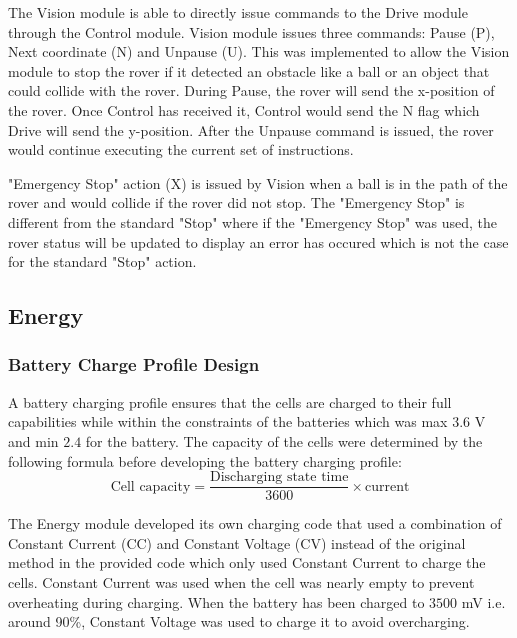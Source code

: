 \documentclass[11pt, a4paper]{article}
\begin{document}
The Vision module is able to directly issue commands to the Drive module through the Control module. Vision module issues three commands: Pause (P), Next coordinate (N) and Unpause (U). This was implemented to allow the Vision module to stop the rover if it detected an obstacle like a ball or an object that could collide with the rover. During Pause, the rover will send the x-position of the rover. Once Control has received it, Control would send the N flag which Drive will send the y-position. After the Unpause command is issued, the rover would continue executing the current set of instructions.
    
"Emergency Stop" action (X) is issued by Vision when a ball is in the path of the rover and would collide if the rover did not stop. The "Emergency Stop" is different from the standard "Stop" where if the "Emergency Stop" was used, the rover status will be updated to display an error has occured which is not the case for the standard "Stop" action. 


\pagebreak
\subsection{Energy}
\subsubsection{Battery Charge Profile Design}

A battery charging profile ensures that the cells are charged to their full capabilities while within the constraints of the batteries which was max $3.6$ V and min $2.4$ for the battery. The capacity of the cells were determined by the following formula before developing the battery charging profile:
$$
\text{Cell capacity} = \frac{\text{Discharging state time}}{3600} \times \text{current}
$$

The Energy module developed its own charging code that used a combination of Constant Current (CC) and Constant Voltage (CV) instead of the original method in the provided code which only used Constant Current to charge the cells. Constant Current was used when the cell was nearly empty to prevent overheating during charging\cite{Energy_constant_current}. When the battery has been charged to $3500$ mV i.e. around 90\%, Constant Voltage was used to charge it to avoid overcharging. 
\end{document}
